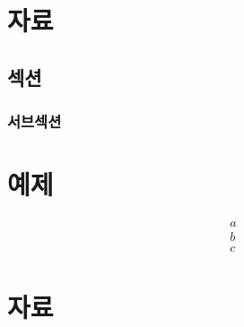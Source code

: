 \documentclass[final,doctor,korean,pdfdoc]{konkukthesis}
\begin{document}



\clearpage
\AppendixTitleToToc
\AttachAppendixTitleToSecnum
\appendix
\renewcommand\thechapter{\Alph{APPchapter}}
\renewcommand\thesection{\thechapter.\arabic{APPsection}}
\renewcommand\thesubsection{\thesection.\arabic{APPsubsection}}
\setcounter{APPchapter}{0}

\renewcommand*\prechapternum{\chapnamefont \appendixname\space}
\renewcommand*\postchapternum{}



\renewcommand\hchaptertitlehead{\appendixname\,\thechapter\,}
 
\chapter{자료}
\section{섹션}
\subsection{서브섹션}
\chapter{예제}
 
\begin{align}
 a
 \\b
 \\c
\end{align}

\chapter{자료}

%
\end{document}
